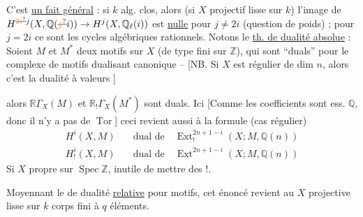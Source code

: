 C'est \uline{un fait général} : si $k$ alg. %
clos, alors (si $X$ projectif lisse sur $k$) l'image %
de $H^{\deleted{\unsure{2i}}j}(X,\mathbb{Q}(\deleted{\unsure{j}}i))\to H^j(X,\mathbb{Q}_{\ell}(i))$ %
est \uline{nulle} pour $j\ne 2i$ (question de %
poids) ; pour $j=2i$ ce sont les cycles %
algébriques  rationnels. %
Notons le \uline{th. de dualité absolue} : %
Soient $M$ et $M^*$ deux  motifs sur %
$X$ (de type fini sur $\mathbb{Z}$), qui sont %
\textquotedblleft duals\textquotedblright{} pour le \deleted{\unsure{\textup{[}}}complexe de motifs %
dualisant\deleted{\unsure{\textup{]}}} canonique -- [NB. Si $X$ %
est régulier  de dim $n$, alors %
c'est la dualité à valeurs  ] %

alors $\mathbb{R}\Gamma_X(M)$ et $\mathbb{R}_!\Gamma_X(M^*)$ sont %
duals. Ici [Comme les coefficients sont %
ess. $\mathbb{Q}$, donc il n'y a pas de $\operatorname{Tor}$] %
ceci revient aussi à la formule (cas régulier) %
\[
\boxed{\begin{aligned}
H^i(X,M)&\quad\text{dual de}\quad\operatorname{Ext}^{2n+1-i}_!(X;M,\mathbb{Q}(n))\\ %
H^i_!(X,M)&\quad\text{dual de}\quad\operatorname{Ext}^{2n+1-i}(X;M,\mathbb{Q}(n)) %
\end{aligned}}
\]
Si $X$ propre sur $\operatorname{Spec}\mathbb{Z}$, inutile de mettre %
des $!$. %

Moyennant le  de dualité \uline{relative} %
pour motifs, cet énoncé revient au %
$X$ projective lisse  sur $k$ corps fini à $q$ éléments. %

